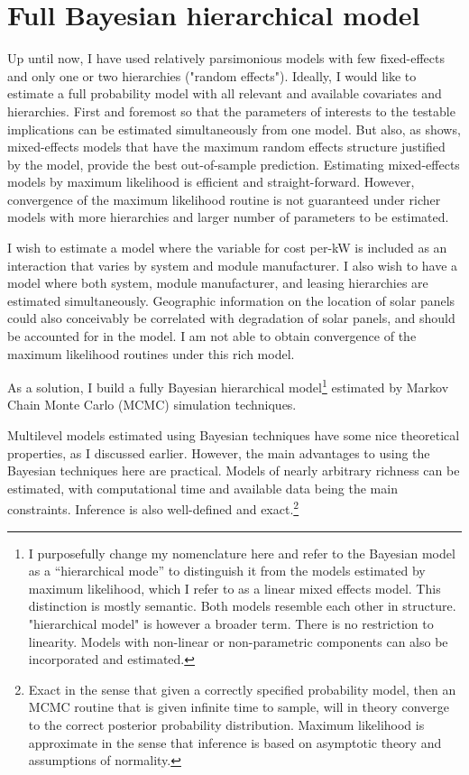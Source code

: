 \documentclass[a4paper]{article}
\begin{document}
\section{Full Bayesian hierarchical model}
Up until now, I have used relatively parsimonious models with few fixed-effects and only one or two hierarchies ("random effects").  Ideally, I would like to estimate a full probability model with all relevant and available covariates and hierarchies. First and foremost so that the parameters of interests to the testable implications can be estimated simultaneously from one model. But also, as \citet{barr_random_2013} shows, mixed-effects models that have the maximum random effects structure justified by the model, provide the best out-of-sample prediction. Estimating mixed-effects models by maximum likelihood is efficient and straight-forward. However, convergence of the maximum likelihood routine is not guaranteed under richer models with more hierarchies and larger number of parameters to be estimated.

I wish to estimate a model where the variable for cost per-kW is included as an interaction that varies by system and module manufacturer. I also wish to have a model where both system, module manufacturer, and leasing hierarchies are estimated simultaneously. Geographic information on the location of solar panels could also conceivably be correlated with degradation of solar panels, and should be accounted for in the model.  I am not able to obtain convergence of the maximum likelihood routines under this rich model.

As a solution, I build a fully Bayesian hierarchical model\footnote{I purposefully change my nomenclature here and refer to the Bayesian model as a ``hierarchical mode'' to distinguish it from the models estimated by maximum likelihood, which I refer to as a linear mixed effects model. This distinction is mostly semantic. Both models resemble each other in structure. "hierarchical model" is however a broader term. There is no restriction to linearity. Models with non-linear or non-parametric components can also be incorporated and estimated.} estimated by Markov Chain Monte Carlo (MCMC) simulation techniques.

Multilevel models estimated using Bayesian techniques have some nice theoretical properties, as I discussed earlier. However, the main advantages to using the Bayesian techniques here are practical. Models of nearly arbitrary richness can be estimated, with computational time and available data being the main constraints. Inference is also well-defined and exact.\footnote{Exact in the sense that given a correctly specified probability model, then an MCMC routine that is given infinite time to sample, will in theory converge to the correct posterior probability distribution. Maximum likelihood is approximate in the sense that inference is based on asymptotic theory and assumptions of normality.}
\end{document}
